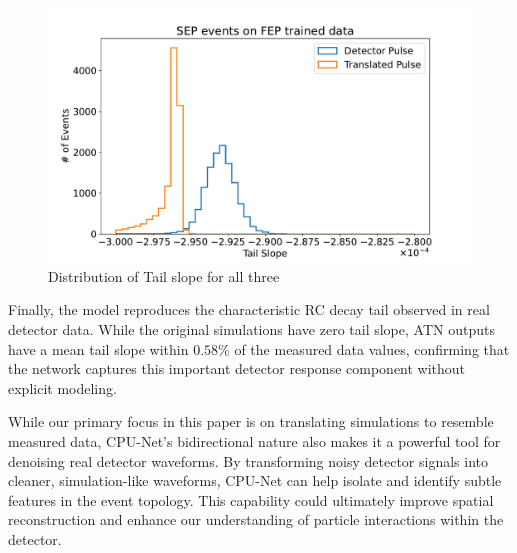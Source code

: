 \begin{figure}[htb!]
\centering
\includegraphics[width=0.99\linewidth,trim={2pc 0pc 2pc 0pc},clip]{ch8/figs/SEP_ts.pdf}
\caption{ Distribution of Tail slope for all three}
\label{ch8:fig:tail_slope_sim}
\end{figure}


Finally, the model reproduces the characteristic RC decay tail observed in real detector data. While the original simulations have zero tail slope, ATN outputs have a mean tail slope within $0.58\%$ of the measured data values, confirming that the network captures this important detector response component without explicit modeling. 

While our primary focus in this paper is on translating simulations to resemble measured data, CPU-Net’s bidirectional nature also makes it a powerful tool for denoising real detector waveforms. By transforming noisy detector signals into cleaner, simulation-like waveforms, CPU-Net can help isolate and identify subtle features in the event topology. This capability could ultimately improve spatial reconstruction and enhance our understanding of particle interactions within the detector.

